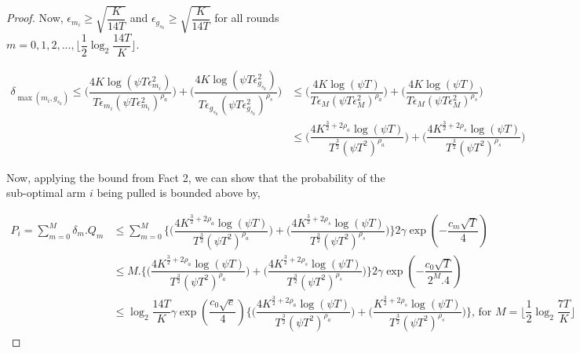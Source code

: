 \begin{proof}
Now, $\epsilon_{m_{i}}\geq \sqrt{\dfrac{K}{14 T}}$ and $\epsilon_{g_{s_{k}}}\geq \sqrt{\dfrac{K}{14 T}}$ for all rounds $m=0,1,2,...,\big \lfloor \dfrac{1}{2}\log_{2} \dfrac{14 T}{K}\big\rfloor$.

\begin{align*}
\delta_{\max(m_{i},g_{s_{k}})} \leq \bigg(\dfrac{4K\log (\psi T \epsilon_{m_{i}}^{2})}{T\epsilon_{m_{i}}(\psi T\epsilon_{m_{i}}^{2})^{\rho_{a}}}\bigg) + \bigg(\dfrac{4K\log (\psi T \epsilon_{g_{s_{k}}}^{2})}{T\epsilon_{g_{s_{k}}}(\psi  T\epsilon_{g_{s_{k}}}^{2})^{\rho_{s}}}\bigg)
 &\leq \bigg(\dfrac{4K\log (\psi T )}{T\epsilon_{M}(\psi T\epsilon_{M}^{2})^{\rho_{a}}}\bigg) + \bigg(\dfrac{4K\log (\psi T )}{T\epsilon_{M}(\psi  T\epsilon_{M}^{2})^{\rho_{s}}}\bigg)\\
& \leq \bigg(\dfrac{4K^{\frac{3}{2} +2\rho_a}\log (\psi T )}{T^{\frac{3}{2}}(\psi T^2)^{\rho_{a}}}\bigg) + \bigg(\dfrac{4K^{\frac{3}{2} +2\rho_s}\log (\psi T )}{T^{\frac{3}{2}}(\psi T^2)^{\rho_{s}}}\bigg)
\end{align*}

Now, applying the bound from Fact 2, we can show that the probability of the sub-optimal arm $i$ being pulled is bounded above by,

\begin{align*}
P_{i} = \sum_{m=0}^{M} \delta_{m}.Q_{m} &\leq \sum_{m=0}^{M} \bigg\lbrace\bigg(\dfrac{4K^{\frac{3}{2} +2\rho_a}\log (\psi T )}{T^{\frac{3}{2}}(\psi T^2)^{\rho_{a}}}\bigg) + \bigg(\dfrac{4K^{\frac{3}{2} +2\rho_{s}}\log (\psi T )}{T^{\frac{3}{2}}(\psi T^2)^{\rho_{s}}}\bigg)\bigg\rbrace 2\gamma \exp(-\dfrac{c_{m}\sqrt{T}}{4})\\
& \leq M.\bigg\lbrace\bigg(\dfrac{4K^{\frac{3}{2} +2\rho_a}\log (\psi T )}{T^{\frac{3}{2}}(\psi T^2)^{\rho_{a}}}\bigg) + \bigg(\dfrac{4K^{\frac{3}{2} +2\rho_{s}}\log (\psi T )}{T^{\frac{3}{2}}(\psi T^2)^{\rho_{s}}}\bigg)\bigg\rbrace 2\gamma \exp(-\dfrac{c_{0}\sqrt{T}}{2^{M}.4})\\
& \leq \log_{2}\dfrac{14T}{K}\gamma \exp(\dfrac{c_{0}\sqrt{e}}{4})\bigg\lbrace\bigg(\dfrac{4K^{\frac{3}{2} +2\rho_{a}}\log (\psi T )}{T^{\frac{3}{2}}(\psi T^2)^{\rho_{a}}}\bigg) + \bigg(\dfrac{K^{\frac{3}{2} +2\rho_{s}}\log (\psi T )}{T^{\frac{3}{2}}(\psi T^2)^{\rho_{s}}}\bigg)\bigg\rbrace \text{, for $M=\big \lfloor \dfrac{1}{2}\log_{2} \dfrac{7T}{K}\big\rfloor$}
\end{align*}


\end{proof}
